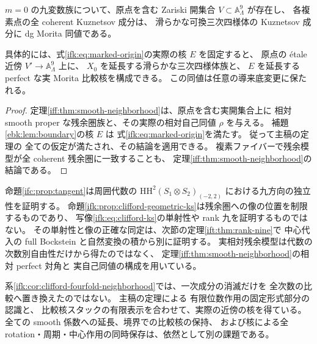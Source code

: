 \begin{corollary}[四次元九変数族の原点近傍における可換比較]
\label{ifk:cor:clifford-fourfold-neighborhood}
$m=0$ の九変数族について、原点を含む Zariski 開集合
$V\subset\mathbb A^9_\Lambda$ が存在し、
各複素点の全 coherent Kuznetsov 成分は、
滑らかな可換三次四様体の Kuznetsov 成分に dg Morita 同値である。

具体的には、式\eqref{ifk:eq:marked-origin}の実際の核 $E$ を固定すると、
原点の \'etale 近傍 $V'\to\mathbb A^9_\Lambda$ 上に、
$X_0$ を延長する滑らかな三次四様体族と、
$E$ を延長する perfect な実 Morita 比較核を構成できる。
この同値は任意の導来底変更に保たれる。
\end{corollary}

\begin{proof}
定理\ref{iff:thm:smooth-neighborhood}は、原点を含む実開集合上に
相対 smooth proper な残余圏族と、その実際の相対自己同値 $\rho$ を与える。
補題\ref{ebk:lem:boundary}の核 $E$ は
式\eqref{ifk:eq:marked-origin}を満たす。
従って主稿の定理の
全ての仮定が満たされ、その結論を適用できる。
複素ファイバーで残余模型が全 coherent 残余圏に一致することも、
定理\ref{iff:thm:smooth-neighborhood}の結論である。
\end{proof}

\begin{remark}[接類と局所比較の範囲]
\label{ifk:rem:tangent-scope}
命題\ref{ifc:prop:tangent}は周囲代数の
$\mathrm{HH}^2(S_1\otimes S_2)_{(-2,2)}$ における九方向の独立性を証明する。
命題\ref{ifk:prop:clifford-geometric-ks}は残余圏への像の位置を制限するものであり、
写像\eqref{ifk:eq:clifford-ks}の単射性や rank 九を証明するものではない。
その単射性と像の正確な同定は、次節の定理\ref{ift:thm:rank-nine}で
中心代入の full Bockstein と自然変換の積から別に証明する。
実相対残余模型は代数の次数別自由性だけから得たのではなく、
定理\ref{iff:thm:smooth-neighborhood}の相対 perfect 対角と
実自己同値の構成を用いている。

系\ref{ifk:cor:clifford-fourfold-neighborhood}では、一次成分の消滅だけを
全次数の比較へ置き換えたのではない。
主稿の定理による
有限位数作用の固定形式部分の認識と、
比較核スタックの有限表示を合わせて、実際の近傍の核を得ている。
全ての smooth 係数への延長、境界での比較核の保持、
および核による全 rotation・周期・中心作用の同時保存は、依然として別の課題である。
\end{remark}
